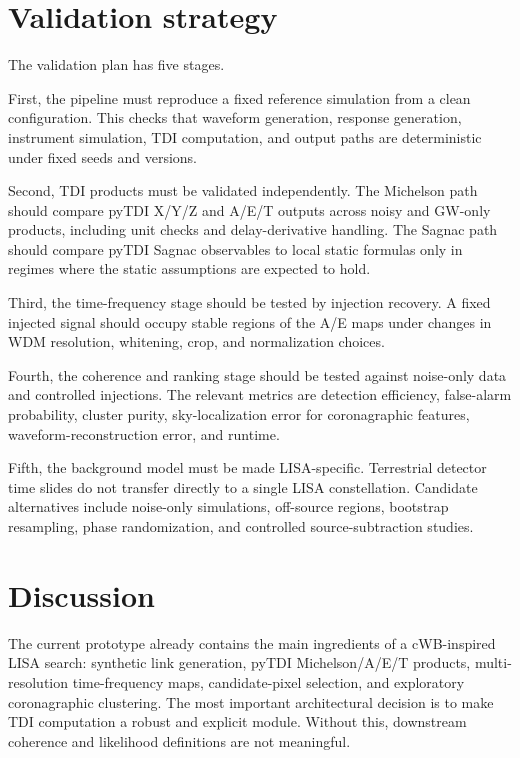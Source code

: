 \documentclass[%
 reprint,
 amsmath,amssymb,
 aps,
 prd,
]{revtex4-2}
\begin{document}
\section{Validation strategy}
\label{sec:validation}

The validation plan has five stages.

First, the pipeline must reproduce a fixed reference simulation from a clean configuration.  This checks that waveform generation, response generation, instrument simulation, TDI computation, and output paths are deterministic under fixed seeds and versions.

Second, TDI products must be validated independently.  The Michelson path should compare pyTDI X/Y/Z and A/E/T outputs across noisy and GW-only products, including unit checks and delay-derivative handling.  The Sagnac path should compare pyTDI Sagnac observables to local static formulas only in regimes where the static assumptions are expected to hold.

Third, the time-frequency stage should be tested by injection recovery.  A fixed injected signal should occupy stable regions of the A/E maps under changes in WDM resolution, whitening, crop, and normalization choices.

Fourth, the coherence and ranking stage should be tested against noise-only data and controlled injections.  The relevant metrics are detection efficiency, false-alarm probability, cluster purity, sky-localization error for coronagraphic features, waveform-reconstruction error, and runtime.

Fifth, the background model must be made LISA-specific.  Terrestrial detector time slides do not transfer directly to a single LISA constellation.  Candidate alternatives include noise-only simulations, off-source regions, bootstrap resampling, phase randomization, and controlled source-subtraction studies.

\section{Discussion}
\label{sec:discussion}

The current prototype already contains the main ingredients of a cWB-inspired LISA search: synthetic link generation, pyTDI Michelson/A/E/T products, multi-resolution time-frequency maps, candidate-pixel selection, and exploratory coronagraphic clustering.  The most important architectural decision is to make TDI computation a robust and explicit module.  Without this, downstream coherence and likelihood definitions are not meaningful.
\end{document}
